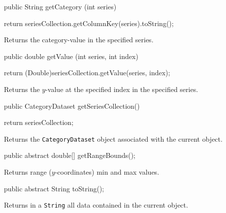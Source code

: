 \begin{code}

   public String getCategory (int series) \begin{hide} {
      return seriesCollection.getColumnKey(series).toString();
   }\end{hide}
\end{code}
\begin{tabb}
   Returns the category-value in the specified series.
\end{tabb}
\begin{htmlonly}
\end{htmlonly}
\begin{code}

   public double getValue (int series, int index) \begin{hide} {
      return (Double)seriesCollection.getValue(series, index);
   }\end{hide}
\end{code}
\begin{tabb}
   Returns the $y$-value at the specified index in the specified series.
\end{tabb}
\begin{htmlonly}
\end{htmlonly}
\begin{code}

   public CategoryDataset getSeriesCollection() \begin{hide} {
      return seriesCollection;
   }\end{hide}
\end{code}
\begin{tabb}
   Returns the \texttt{CategoryDataset} object associated with the current object.
\end{tabb}
\begin{htmlonly}
\end{htmlonly}
\begin{code}

   public abstract double[] getRangeBounds();
\end{code}
\begin{tabb}
   Returns range ($y$-coordinates) min and max values.
\end{tabb}
\begin{htmlonly}
\end{htmlonly}
\begin{code}

   public abstract String toString();
\end{code}
\begin{tabb}
  Returns in a \texttt{String} all data contained in the current object.
\end{tabb}
\begin{htmlonly}
\end{htmlonly}


